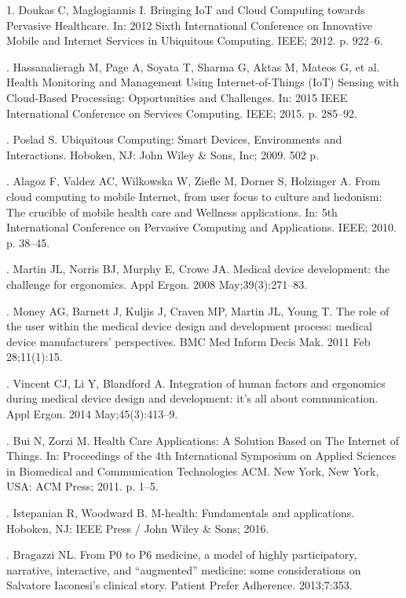 \documentclass[letterpaper,12pt]{article}
\begin{document}
\begin{thebibliography}{299}

1. Doukas C, Maglogiannis I. Bringing IoT and Cloud Computing towards Pervasive Healthcare. In: 2012 Sixth
International Conference on Innovative Mobile and Internet Services in Ubiquitous Computing. IEEE; 2012. p. 922–6.


. Hassanalieragh M, Page A, Soyata T, Sharma G, Aktas M, Mateos G, et al. Health Monitoring and Management Using
Internet-of-Things (IoT) Sensing with Cloud-Based Processing: Opportunities and Challenges. In: 2015 IEEE
International Conference on Services Computing. IEEE; 2015. p. 285–92.

. Poslad S. Ubiquitous Computing: Smart Devices, Environments and Interactions. Hoboken, NJ: John Wiley & Sons,
Inc; 2009. 502 p.

. Alagoz F, Valdez AC, Wilkowska W, Ziefle M, Dorner S, Holzinger A. From cloud computing to mobile Internet,
from user focus to culture and hedonism: The crucible of mobile health care and Wellness applications. In: 5th
International Conference on Pervasive Computing and Applications. IEEE; 2010. p. 38–45.

. Martin JL, Norris BJ, Murphy E, Crowe JA. Medical device development: the challenge for ergonomics. Appl Ergon.
2008 May;39(3):271–83.

. Money AG, Barnett J, Kuljis J, Craven MP, Martin JL, Young T. The role of the user within the medical device design
and development process: medical device manufacturers’ perspectives. BMC Med Inform Decis Mak. 2011 Feb
28;11(1):15.

. Vincent CJ, Li Y, Blandford A. Integration of human factors and ergonomics during medical device design and
development: it’s all about communication. Appl Ergon. 2014 May;45(3):413–9.

. Bui N, Zorzi M. Health Care Applications: A Solution Based on The Internet of Things. In: Proceedings of the 4th
International Symposium on Applied Sciences in Biomedical and Communication Technologies ACM. New York,
New York, USA: ACM Press; 2011. p. 1–5.

. Istepanian R, Woodward B. M-health: Fundamentals and applications. Hoboken, NJ: IEEE Press / John Wiley & Sons;
2016.

. Bragazzi NL. From P0 to P6 medicine, a model of highly participatory, narrative, interactive, and “augmented”
medicine: some considerations on Salvatore Iaconesi’s clinical story. Patient Prefer Adherence. 2013;7:353.


\end{thebibliography}
\end{document}

